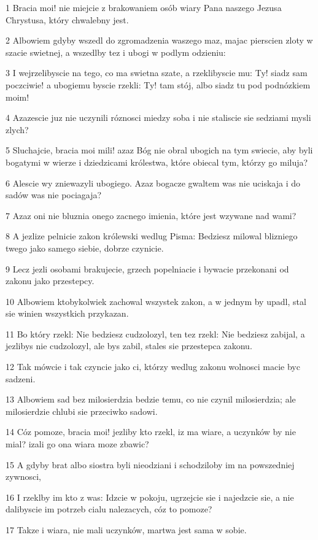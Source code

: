 \par 1 Bracia moi! nie miejcie z brakowaniem osób wiary Pana naszego Jezusa Chrystusa, który chwalebny jest.
\par 2 Albowiem gdyby wszedl do zgromadzenia waszego maz, majac pierscien zloty w szacie swietnej, a wszedlby tez i ubogi w podlym odzieniu:
\par 3 I wejrzelibyscie na tego, co ma swietna szate, a rzeklibyscie mu: Ty! siadz sam poczciwie! a ubogiemu byscie rzekli: Ty! tam stój, albo siadz tu pod podnózkiem moim!
\par 4 Azazescie juz nie uczynili róznosci miedzy soba i nie staliscie sie sedziami mysli zlych?
\par 5 Sluchajcie, bracia moi mili! azaz Bóg nie obral ubogich na tym swiecie, aby byli bogatymi w wierze i dziedzicami królestwa, które obiecal tym, którzy go miluja?
\par 6 Alescie wy zniewazyli ubogiego. Azaz bogacze gwaltem was nie uciskaja i do sadów was nie pociagaja?
\par 7 Azaz oni nie bluznia onego zacnego imienia, które jest wzywane nad wami?
\par 8 A jezlize pelnicie zakon królewski wedlug Pisma: Bedziesz milowal blizniego twego jako samego siebie, dobrze czynicie.
\par 9 Lecz jezli osobami brakujecie, grzech popelniacie i bywacie przekonani od zakonu jako przestepcy.
\par 10 Albowiem ktobykolwiek zachowal wszystek zakon, a w jednym by upadl, stal sie winien wszystkich przykazan.
\par 11 Bo który rzekl: Nie bedziesz cudzolozyl, ten tez rzekl: Nie bedziesz zabijal, a jezlibys nie cudzolozyl, ale bys zabil, stales sie przestepca zakonu.
\par 12 Tak mówcie i tak czyncie jako ci, którzy wedlug zakonu wolnosci macie byc sadzeni.
\par 13 Albowiem sad bez milosierdzia bedzie temu, co nie czynil milosierdzia; ale milosierdzie chlubi sie przeciwko sadowi.
\par 14 Cóz pomoze, bracia moi! jezliby kto rzekl, iz ma wiare, a uczynków by nie mial? izali go ona wiara moze zbawic?
\par 15 A gdyby brat albo siostra byli nieodziani i schodziloby im na powszedniej zywnosci,
\par 16 I rzeklby im kto z was: Idzcie w pokoju, ugrzejcie sie i najedzcie sie, a nie dalibyscie im potrzeb cialu nalezacych, cóz to pomoze?
\par 17 Takze i wiara, nie mali uczynków, martwa jest sama w sobie.
